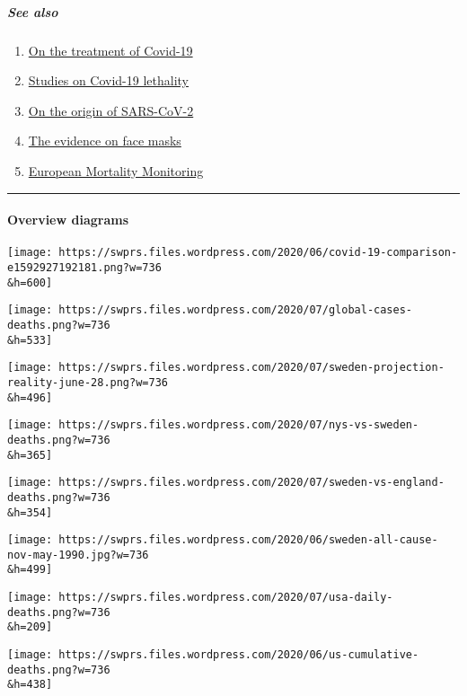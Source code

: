 \hypertarget{see-also}{%
\subparagraph{\texorpdfstring{\textbf{See
also}}{See also}}\label{see-also}}

\begin{enumerate}
\def\labelenumi{\arabic{enumi}.}
\tightlist
\item
  \href{https://swprs.org/on-the-treatment-of-covid-19/}{On the
  treatment of Covid-19}
\item
  \href{https://swprs.org/studies-on-covid-19-lethality/}{Studies on
  Covid-19 lethality}
\item
  \href{https://swprs.org/covid-19-virus-origin-the-mojiang-miners-passage-hypothesis/}{On
  the origin of SARS-CoV-2}
\item
  \href{https://swprs.org/face-masks-evidence/}{The evidence on face
  masks}
\item
  \href{https://euromomo.eu/}{European Mortality Monitoring}
\end{enumerate}

\begin{center}\rule{0.5\linewidth}{\linethickness}\end{center}

\hypertarget{overview-diagrams}{%
\paragraph{Overview diagrams}\label{overview-diagrams}}

\texttt{[image: https://swprs.files.wordpress.com/2020/06/covid-19-comparison-e1592927192181.png?w=736\\\&h=600]}

\texttt{[image: https://swprs.files.wordpress.com/2020/07/global-cases-deaths.png?w=736\\\&h=533]}

\texttt{[image: https://swprs.files.wordpress.com/2020/07/sweden-projection-reality-june-28.png?w=736\\\&h=496]}

\texttt{[image: https://swprs.files.wordpress.com/2020/07/nys-vs-sweden-deaths.png?w=736\\\&h=365]}

\texttt{[image: https://swprs.files.wordpress.com/2020/07/sweden-vs-england-deaths.png?w=736\\\&h=354]}

\texttt{[image: https://swprs.files.wordpress.com/2020/06/sweden-all-cause-nov-may-1990.jpg?w=736\\\&h=499]}

\texttt{[image: https://swprs.files.wordpress.com/2020/07/usa-daily-deaths.png?w=736\\\&h=209]}

\texttt{[image: https://swprs.files.wordpress.com/2020/06/us-cumulative-deaths.png?w=736\\\&h=438]}

